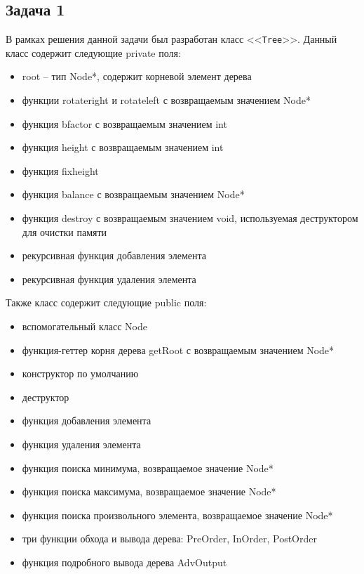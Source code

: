 \documentclass[a4paper,12pt]{article}
\begin{document}
\subsection{Задача 1}
\noindent В рамках решения данной задачи был разработан класс  <<\verb!Tree!>>. Данный класс содержит следующие private поля: 
\begin{itemize}
  \item root -- тип Node*, содержит корневой элемент дерева
  \item функции rotateright и rotateleft с возвращаемым значением Node*
  \item функция bfactor с возвращаемым значением int
  \item функция height с возвращаемым значением int
  \item функция fixheight
  \item функция balance с возвращаемым значением Node*
  \item функция destroy с возвращаемым значением void, используемая деструктором для очистки памяти
  \item рекурсивная функция добавления элемента
   \item рекурсивная функция удаления элемента
  
\end{itemize} 
Также класс содержит следующие public поля:
\begin{itemize}
  \item вспомогательный класс Node
  \item функция-геттер корня дерева getRoot с возвращаемым значением Node*
  \item конструктор по умолчанию
  \item деструктор
  \item функция добавления элемента
  \item функция удаления элемента
  \item функция поиска минимума, возвращаемое значение Node*
  \item функция поиска максимума, возвращаемое значение Node*
  \item функция поиска произвольного элемента, возвращаемое значение Node*
  \item три функции обхода и вывода дерева: PreOrder, InOrder, PostOrder
  \item функция подробного вывода дерева AdvOutput
  
\end{itemize} 
\end{document}
